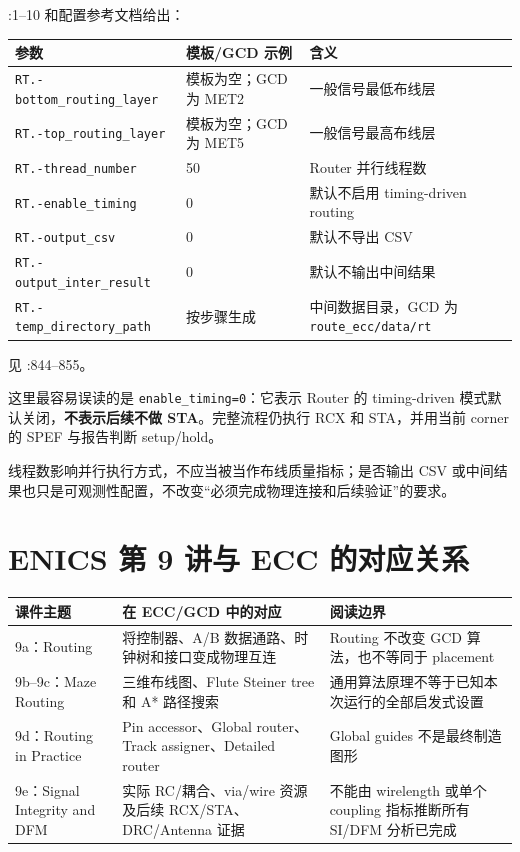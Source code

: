 \documentclass[UTF8,a4paper,11pt,fontset=fandol]{ctexart}
\newcommand{\code}[1]{\nolinkurl{#1}}
\begin{document}
:1--10 和配置参考文档给出：
\begin{center}
\begin{tabularx}{\textwidth}{p{}p{}X}
\toprule
参数 & 模板/GCD 示例 & 含义 \\
\midrule
\code{RT.-bottom_routing_layer} & 模板为空；GCD 为 MET2 & 一般信号最低布线层 \\
\code{RT.-top_routing_layer} & 模板为空；GCD 为 MET5 & 一般信号最高布线层 \\
\code{RT.-thread_number} & 50 & Router 并行线程数 \\
\code{RT.-enable_timing} & 0 & 默认不启用 timing-driven routing \\
\code{RT.-output_csv} & 0 & 默认不导出 CSV \\
\code{RT.-output_inter_result} & 0 & 默认不输出中间结果 \\
\code{RT.-temp_directory_path} & 按步骤生成 & 中间数据目录，GCD 为 \code{route_ecc/data/rt} \\
\bottomrule
\end{tabularx}
\end{center}
见 :844--855。

这里最容易误读的是 \code{enable_timing=0}：它表示 Router 的 timing-driven 模式默认关闭，\textbf{不表示后续不做 STA}。完整流程仍执行 RCX 和 STA，并用当前 corner 的 SPEF 与报告判断 setup/hold。

线程数影响并行执行方式，不应当被当作布线质量指标；是否输出 CSV 或中间结果也只是可观测性配置，不改变“必须完成物理连接和后续验证”的要求。

\section{ENICS 第 9 讲与 ECC 的对应关系}

\begin{center}
\begin{tabularx}{\textwidth}{p{}p{}X}
\toprule
课件主题 & 在 ECC/GCD 中的对应 & 阅读边界 \\
\midrule
9a：Routing & 将控制器、A/B 数据通路、时钟树和接口变成物理互连 & Routing 不改变 GCD 算法，也不等同于 placement \\
9b--9c：Maze Routing & 三维布线图、Flute Steiner tree 和 A* 路径搜索 & 通用算法原理不等于已知本次运行的全部启发式设置 \\
9d：Routing in Practice & Pin accessor、Global router、Track assigner、Detailed router & Global guides 不是最终制造图形 \\
9e：Signal Integrity and DFM & 实际 RC/耦合、via/wire 资源及后续 RCX/STA、DRC/Antenna 证据 & 不能由 wirelength 或单个 coupling 指标推断所有 SI/DFM 分析已完成 \\
\bottomrule
\end{tabularx}
\end{center}
\end{document}
